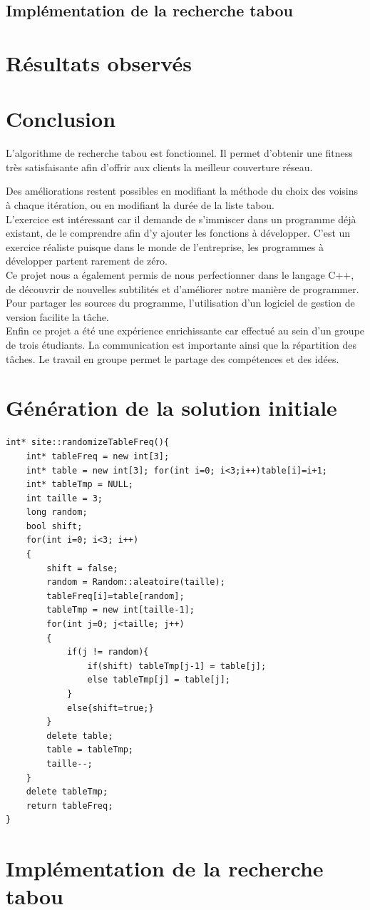 \documentclass[a4paper, 12pt]{report}
\begin{document}
\section{Implémentation de la recherche tabou}

\chapter{Résultats observés}

\chapter{Conclusion}
L'algorithme de recherche tabou est fonctionnel. Il permet d'obtenir une fitness très satisfaisante afin d'offrir aux clients la meilleur couverture réseau.

Des améliorations restent possibles en modifiant la méthode du choix des voisins à chaque itération, ou en modifiant la durée de la liste tabou.\\

L'exercice est intéressant car il demande de s'immiscer dans un programme déjà existant, de le comprendre afin d'y ajouter les fonctions à développer. C'est un exercice réaliste puisque dans le monde de l'entreprise, les programmes à développer partent rarement de zéro.\\

Ce projet nous a également permis de nous perfectionner dans le langage C++, de découvrir de nouvelles subtilités et d'améliorer notre manière de programmer. Pour partager les sources du programme, l'utilisation d'un logiciel de gestion de version facilite la tâche.\\

Enfin ce projet a été une expérience enrichissante car effectué au sein d'un groupe de trois étudiants. La communication est importante ainsi que la répartition des tâches. Le travail en groupe permet le partage des compétences et des idées. \\

\appendix
\chapter{Génération de la solution initiale}
\begin{lstlisting}
int* site::randomizeTableFreq(){
    int* tableFreq = new int[3];
    int* table = new int[3]; for(int i=0; i<3;i++)table[i]=i+1;
    int* tableTmp = NULL;
    int taille = 3;
    long random;
    bool shift;
    for(int i=0; i<3; i++)
    {
        shift = false;
        random = Random::aleatoire(taille);
        tableFreq[i]=table[random];
        tableTmp = new int[taille-1];
        for(int j=0; j<taille; j++)
        {
            if(j != random){
                if(shift) tableTmp[j-1] = table[j];
                else tableTmp[j] = table[j];
            }
            else{shift=true;}
        }
        delete table;
        table = tableTmp;
        taille--;
    }
    delete tableTmp;
    return tableFreq;
}
\end{lstlisting}

\chapter{Implémentation de la recherche tabou}
\begin{lstlisting}
\end{lstlisting}
\end{document}
